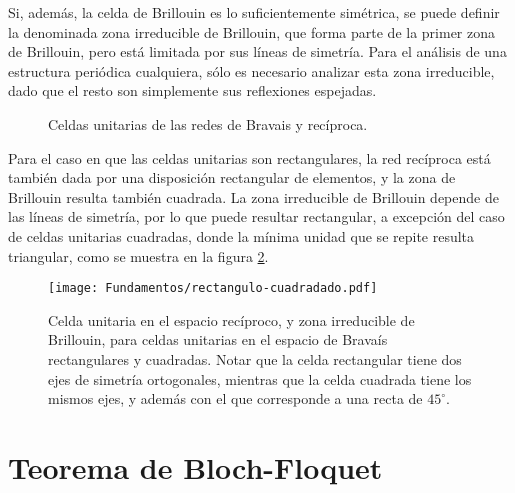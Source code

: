 Si, además, la celda de Brillouin es lo suficientemente simétrica, se puede definir la denominada zona irreducible de Brillouin, que forma parte de la primer zona de Brillouin, pero está limitada por sus líneas de simetría. Para el análisis de una estructura periódica cualquiera, sólo es necesario analizar esta zona irreducible, dado que el resto son simplemente sus reflexiones espejadas.

\begin{figure}[H]
	\centering 
	\hspace{0pt}
	\caption{Celdas unitarias de las redes de Bravais y recíproca.}
	\label{fig:celdas-unitarias}
\end{figure}

Para el caso en que las celdas unitarias son rectangulares, la red recíproca está también dada por una disposición rectangular de elementos, y la zona de Brillouin resulta también cuadrada. La zona irreducible de Brillouin depende de las líneas de simetría, por lo que puede resultar rectangular, a excepción del caso de celdas unitarias cuadradas, donde la mínima unidad que se repite resulta triangular, como se muestra en la figura \ref{fig:rectangulo-cuadrado}.

\begin{figure}[htp]
	\centering
	\texttt{[image: Fundamentos/rectangulo-cuadradado.pdf]}
	\caption{Celda unitaria en el espacio recíproco, y zona irreducible de Brillouin, para celdas unitarias en el espacio de Bravaís rectangulares y cuadradas. Notar que la celda rectangular tiene dos ejes de simetría ortogonales, mientras que la celda cuadrada tiene los mismos ejes, y además con el que corresponde a una recta de $45^{\circ}$.}
	\label{fig:rectangulo-cuadrado}
\end{figure}

\section{Teorema de Bloch-Floquet}
\label{sec:bloch-floquet}

